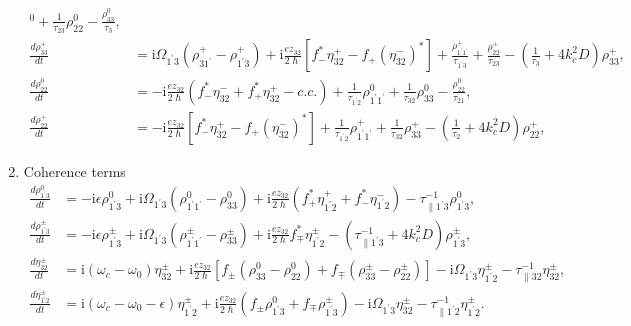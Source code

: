 \documentclass[10pt]{article}
\begin{document}
\begin{enumerate}
\begin{subequations}
\begin{align}
^{0}+\frac{1}{\tau_{23}}\rho_{22}^{0}-\frac{\rho_{33}^{0}}{\tau_{3}},\\
\frac{d\rho_{33}^{+}}{dt} &=\mathrm{i}\Omega_{1^{\prime}3}\left(
\rho_{31^{\prime}}^{+}-\rho_{1^{\prime}3}^{+}\right)  +\mathrm{i}\frac
{ez_{32}}{2\hslash}\left[  f_{-}^{\ast}\eta_{32}^{+}-f_{+}(\eta_{32}^{-})^{\ast
}\right]  +\frac{\rho_{1^{\prime}1^{\prime}}^{+}}{\tau_{1^{\prime}3}}%
+\frac{\rho_{22}^{+}}{\tau_{23}}-\left(  \frac{1}{\tau_{3}}+4k_{c}%
^{2}D\right)  \rho_{33}^{+},\label{eq:rtpop3grating}\\
\frac{d\rho_{22}^{0}}{dt} &=-\mathrm{i}\frac{ez_{32}}{2\hslash}\left(
f_{-}^{\ast}\eta_{32}^{-}+f_{+}^{\ast}\eta_{32}^{+}-c.c.\right)  +\frac
{1}{\tau_{1^{\prime}2}}\rho_{1^{\prime}1^{\prime}}^{0}+\frac{1}{\tau_{32}}%
\rho_{33}^{0}-\frac{\rho_{22}^{0}}{\tau_{21}},\\
\frac{d\rho_{22}^{+}}{dt} &=-\mathrm{i}\frac{ez_{32}}{2\hslash}\left[
f_{-}^{\ast}\eta_{32}^{+}-f_{+}(\eta_{32}^{-})^{\ast}\right]  +\frac{1}%
{\tau_{1^{\prime}2}}\rho_{1^{\prime}1^{\prime}}^{+}+\frac{1}{\tau_{32}}%
\rho_{33}^{+}-\left(  \frac{1}{\tau_{2}}+4k_{c}^{2}D\right)  \rho_{22}^{+},
\label{eq:rtpop2grating}%
\end{align}
\end{subequations}
\item {Coherence terms}%
\begin{subequations}%
\label{eq:coherencesdm}
\begin{align}
\frac{d\rho_{1^{\prime}3}^{0}}{dt} &=-\mathrm{i}\epsilon\rho_{1^{\prime}%
3}^{0}+\mathrm{i}\Omega_{1^{\prime}3}\left(  \rho_{1^{\prime}1^{\prime}}%
^{0}-\rho_{33}^{0}\right)  +\mathrm{i}\frac{ez_{32}}{2\hslash}\left(
f_{+}^{\ast}\eta_{1^{\prime}2}^{+}+f_{-}^{\ast}\eta_{1^{\prime}2}^{-}\right)
-\tau_{\parallel1^{\prime}3}^{-1}\rho_{1^{\prime}3}^{0},\\
\frac{d\rho_{1^{\prime}3}^{\pm}}{dt}&=-\mathrm{i}\epsilon\rho_{1^{\prime}%
3}^{\pm}+\mathrm{i}\Omega_{1^{\prime}3}\left(  \rho_{1^{\prime}1^{\prime}%
}^{\pm}-\rho_{33}^{\pm}\right)  +\mathrm{i}\frac{ez_{32}}{2\hslash}f_{\mp}%
^{\ast}\eta_{1^{\prime}2}^{\pm}-\left(  \tau_{\parallel1^{\prime}3}%
^{-1}+4k_{c}^{2}D\right)  \rho_{1^{\prime}3}^{\pm},\label{eq:rho13grating}\\
\frac{d\eta_{32}^{\pm}}{dt} & =\mathrm{i}\left(  \omega_{c}-\omega_{0}\right)
\eta_{32}^{\pm}+\mathrm{i}\frac{ez_{32}}{2\hslash}\left[  f_{\pm}(\rho_{33}%
^{0}-\rho_{22}^{0})+f_{\mp}(\rho_{33}^{\pm}-\rho_{22}^{\pm})\right]
-\mathrm{i}\Omega_{1^{\prime}3}\eta_{1^{\prime}2}^{\pm}-\tau_{\parallel
32}^{-1}\eta_{32}^{\pm},\\
\frac{d\eta_{1^{\prime}2}^{\pm}}{dt} & =\mathrm{i}\left(  \omega_{c}%
-\omega_{0}-\epsilon\right)  \eta_{1^{\prime}2}^{\pm}+\mathrm{i}\frac{ez_{32}%
}{2\hslash}\left(  f_{\pm}\rho_{1^{\prime}3}^{0}+f_{\mp}\rho_{1^{\prime}3}^{\pm
}\right)  -\mathrm{i}\Omega_{1^{\prime}3}\eta_{32}^{\pm}-\tau_{\parallel
1^{\prime}2}^{-1}\eta_{1^{\prime}2}^{\pm}. \label{eq:rho12-dm}%
\end{align}
\end{subequations}
\end{enumerate}
\end{document}

